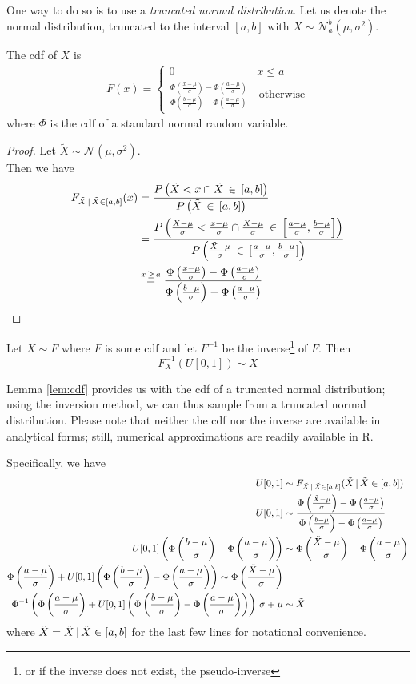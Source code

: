 One way to do so is to use a \textit{truncated normal distribution}.
Let us denote the normal distribution, truncated to the interval $[a, b]$ with $X \sim \mathcal{N}_a^b(\mu, \sigma^2)$. 

\begin{lemma}
	The cdf of $X$ is \\
	\begin{align*}
	F(x) = \begin{cases}
		0	& x \leq  a \\
		\frac{
			\Phi\left( \frac{x - \mu}{\sigma} \right)
			- \Phi\left(\frac{a - \mu}{\sigma}\right)
		}{
		\Phi\left(\frac{b - \mu}{\sigma}\right)
		- \Phi\left(\frac{a - \mu}{\sigma}\right)
		}
	    & \, \text{otherwise}
		\end{cases}
	\end{align*}
	where $\Phi$ is the cdf of a standard normal random variable.
	\label{lem:cdf}
\end{lemma}

\begin{proof}
	Let $\tilde{X} \sim \mathcal{N}(\mu, \sigma^2)$. \\
	Then we have 
	\begin{align*}
		F_{ \tilde{X} \, | \, \tilde{X} \in [a, b]}(x) &= \frac{P \left(\tilde{X} < x \cap \tilde{X} \, \in \, [a, b]\right) }{P \left(\tilde{X} \, \in \, [a, b]\right)} \\
		&= \frac{P \left(\frac{\tilde{X} - \mu }{\sigma} < \frac{x - \mu }{\sigma} \cap \frac{\tilde{X} - \mu }{\sigma} \, \in \, \left[\frac{a - \mu }{\sigma}, \frac{b - \mu }{\sigma} \right]\right) }{P \left(\frac{\tilde{X} - \mu }{\sigma} \, \in \, [\frac{a - \mu }{\sigma}, \frac{b - \mu }{\sigma}]\right)} \\
		&\overset{x \, \geq \, a}{=} \frac{\Phi\left(\frac{x - \mu}{\sigma}\right) - \Phi\left(\frac{a - \mu}{\sigma}\right)}{\Phi\left(\frac{b - \mu}{\sigma}\right) - \Phi\left(\frac{a - \mu}{\sigma}\right)}
	\end{align*}
\end{proof}

\begin{theorem}
Let $X \sim F$ where $F$ is some cdf and let $F^{-1}$ be the inverse\footnote{or if the inverse does not exist, the pseudo-inverse} of $F$. 
Then
\[
F_X^{-1}(U[0, 1]) \sim X
\]
\end{theorem}

Lemma \ref{lem:cdf} provides us with the cdf of a truncated normal distribution; using the inversion method, we can thus sample from a truncated normal distribution. Please note that neither the cdf nor the inverse are available in analytical forms; still, numerical approximations are readily available in R.

Specifically, we have
\begin{align*}
		U[0, 1] &\sim 	F_{ \tilde{X} \, | \, \tilde{X} \in [a, b]}( \tilde{X} \, | \, \tilde{X} \in [a, b]) \\
		U[0, 1] &\sim \frac{\Phi\left(\frac{\tilde{X} - \mu}{\sigma}\right) - \Phi\left(\frac{a - \mu}{\sigma}\right)}{\Phi\left(\frac{b - \mu}{\sigma}\right) - \Phi\left(\frac{a - \mu}{\sigma}\right)} \\
		U[0, 1] \left(\Phi\left(\frac{b - \mu}{\sigma}\right) - \Phi\left(\frac{a - \mu}{\sigma}\right)\right) &\sim \Phi\left(\frac{\tilde{X} - \mu}{\sigma}\right) - \Phi\left(\frac{a - \mu}{\sigma}\right) \\
		\Phi\left(\frac{a - \mu}{\sigma}\right) + U[0, 1] \left(\Phi\left(\frac{b - \mu}{\sigma}\right) - \Phi\left(\frac{a - \mu}{\sigma}\right)\right) \sim \Phi\left(\frac{\tilde{X} - \mu}{\sigma}\right) \\
		\Phi^{-1} \left(
			\Phi\left(\frac{a - \mu}{\sigma}\right) + U[0, 1] \left(\Phi\left(\frac{b - \mu}{\sigma}\right) - \Phi\left(\frac{a - \mu}{\sigma}\right)\right)
		\right) \, \sigma + \mu
		&\sim \tilde{X}
\end{align*}
where $\tilde{X} = \tilde{X} \, | \, \tilde{X} \in [a, b]$ for the last few lines for notational convenience. 

